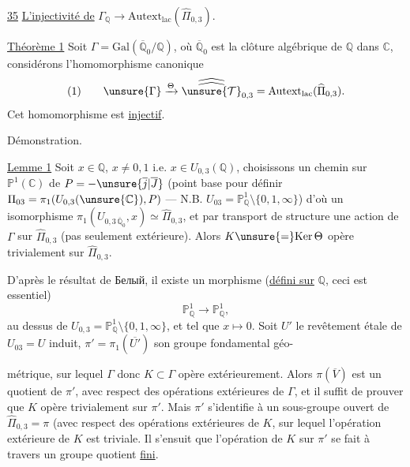 
\uline{35} \uline{L'injectivité de} $\Gamma_{\mathbb Q}\longrightarrow\mathrm{Autext}_{\mathrm{lac}}(\widehat{\Pi}_{0,3})$.


\uline{Théorème 1} Soit $\Gamma=\mathrm{Gal}(\overline{\mathbb Q}_0/\mathbb Q)$, où $\overline{\mathbb Q}_0$ est la clôture algébrique de $\mathbb Q$ dans $\mathbb C$, considérons l'homomorphisme canonique
\[
(1)\qquad \unsure{\Gamma}\xrightarrow{\Theta}\widehat{\widehat{\unsure{\mathcal T}}}_{0,3}=\mathrm{Autext}_{\mathrm{lac}}(\widehat{\Pi}_{0,3}).
\]
Cet homomorphisme est \uline{injectif}.

Démonstration.

\uline{Lemme 1} Soit $x\in\mathbb Q$, $x\ne0,1$ i.e. $x\in U_{0,3}(\mathbb Q)$, choisissons un  chemin sur $\mathbb P^1(\mathbb C)$ de $P=-\unsure{\overline{j}|\overline{J}}$ (point base pour définir $\Pi_{03}=\pi_1(U_{0,3}(\unsure{\mathbb C}),P)$ --- N.B. $U_{03}=\mathbb P^1_{\mathbb Q}\setminus\{0,1,\infty\}$) d'où un isomorphisme $\pi_1(U_{0,3\,\overline{\mathbb Q}_0},x)\simeq\widehat{\Pi}_{0,3}$, et par transport de structure une action  de $\Gamma$ sur $\widehat{\Pi}_{0,3}$ (pas seulement extérieure). Alors $K\unsure{=}\mathrm{Ker}\,\Theta$ opère trivialement sur $\widehat{\Pi}_{0,3}$.

D'après le résultat de Белый, il existe un morphisme (\uline{défini sur} $\mathbb Q$, ceci est essentiel)
\[
\mathbb P^1_{\mathbb Q}\longrightarrow\mathbb P^1_{\mathbb Q},
\]
 au dessus de $U_{0,3}=\mathbb P^1_{\mathbb Q}\setminus\{0,1,\infty\}$, et tel que $x\longmapsto0$. Soit $U'$ le revêtement étale de $U_{03}=U$ induit,  $\pi'=\pi_1(\overline{U'})$ son groupe fondamental géo-


métrique, sur lequel $\Gamma$ donc $K\subset\Gamma$ opère extérieurement. Alors $\pi(\overline V)$ est un quotient de $\pi'$, avec respect des opérations extérieures de $\Gamma$, et il suffit de prouver que $K$ opère trivialement sur $\pi'$. Mais $\pi'$ s'identifie à un sous-groupe ouvert de $\widehat{\Pi}_{0,3}=\pi$ (avec respect des opérations extérieures de $K$, sur lequel l'opération extérieure de $K$ est triviale. Il s'ensuit que l'opération  de $K$ sur $\pi'$ se fait à travers un groupe quotient \uline{fini}.


